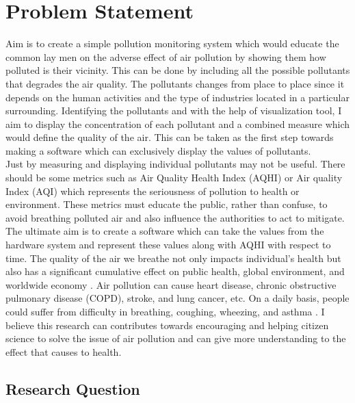\documentclass[11pt]{article}
\begin{document}
\section{Problem Statement}

Aim is to create a simple pollution monitoring system which would educate the common lay men on the adverse effect of air pollution by showing them how polluted is their vicinity.  This can be done by including all the possible pollutants that degrades the air quality. The pollutants changes from place to place since it depends on the human activities and the type of industries located in a particular surrounding. Identifying the pollutants and with the help of visualization tool, I aim to display the concentration of each pollutant and a combined measure which would define the quality of the air. This can be taken as the first step towards making a software which can exclusively display the values of pollutants.\\

Just by measuring and displaying individual pollutants may not be useful. There should be some metrics such as Air Quality Health Index (AQHI) or Air quality Index (AQI) which represents the seriousness of pollution to health or environment. These metrics must educate the public, rather than confuse, to avoid breathing polluted air and also influence the authorities to act to mitigate. The ultimate aim is to create a software which can take the values from the hardware system and represent these values along with AQHI with respect to time. The quality of the air we breathe not only impacts individual's health but also has a significant cumulative effect on public health, global environment, and worldwide economy \cite{AQI14}. Air pollution can cause heart disease, chronic obstructive pulmonary disease (COPD), stroke, and lung cancer, etc. On a daily basis, people could suffer from difficulty in breathing, coughing, wheezing, and asthma \cite{AQI14}.
 I believe this research can  contributes towards encouraging and helping citizen science to solve the issue of air pollution and can give more understanding to the effect that causes to health.
 
 \subsection{Research Question}
 
\end{document}
